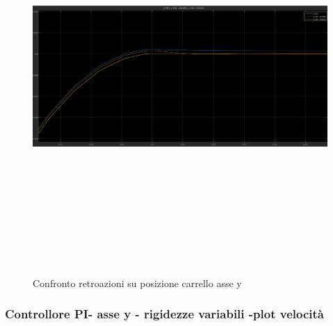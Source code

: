 \documentclass{article}
\begin{document}
\begin{figure}[H]
\centering
\includegraphics[width=13cm,height=15cm,keepaspectratio]{./simulink/ldm_variabile/PIDY_POSIZIONEZOOM}
\caption{Confronto retroazioni su posizione carrello asse y}
\end{figure}
\subsubsection{Controllore PI- asse y  - rigidezze variabili -plot velocità}
\end{document}
